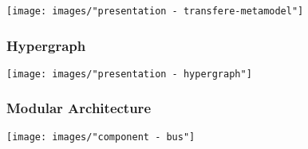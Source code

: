 \begin{frame}
  \frametitle{}
  \hspace{-1.5cm}
  \texttt{[image: images/"presentation - transfere-metamodel"]}
\end{frame}


\begin{frame}
  \frametitle{Hypergraph}
  \hspace{-1cm}
  \texttt{[image: images/"presentation - hypergraph"]}
\end{frame}

\begin{frame}
  \frametitle{Modular Architecture}
  \hspace{-1cm}
  \texttt{[image: images/"component - bus"]}
\end{frame}
